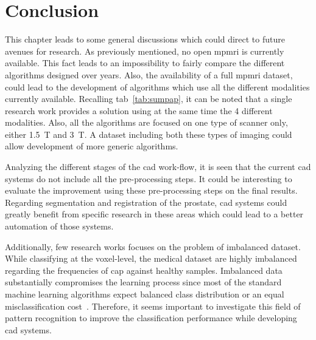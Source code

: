 \section{Conclusion}\label{subsec:chp3:dis:gen-dis}

This chapter leads to some general discussions which could direct to future
avenues for research.
As previously mentioned, no open \ac{mpmri} is currently available.
This fact leads to an impossibility to fairly compare the different algorithms
designed over years.
Also, the availability of a full \ac{mpmri} dataset, could lead to the
development of algorithms which use all the different modalities currently
available.
Recalling \acs{tab}~\ref{tab:sumpap}, it can be noted that a single research
work provides a solution using at the same time the 4 different modalities.
Also, all the algorithms are focused on one type of scanner only, either
\SI{1.5}{\tesla} and \SI{3}{\tesla}.
A dataset including both these types of imaging could allow development of more
generic algorithms.

Analyzing the different stages of the \ac{cad} work-flow, it is seen that the
current \ac{cad} systems do not include all the pre-processing steps.
It could be interesting to evaluate the improvement using these pre-processing
steps on the final results.
Regarding segmentation and registration of the prostate, \ac{cad} systems could
greatly benefit from specific research in these areas which could lead to a
better automation of those systems.

Additionally, few research works focuses on the problem of imbalanced dataset.
While classifying at the voxel-level, the medical dataset are highly imbalanced
regarding the frequencies of \ac{cap} against healthy samples.
Imbalanced data substantially compromises the learning process since most of
the standard machine learning algorithms expect balanced class distribution or
an equal misclassification cost~\cite{he2009learning}.
Therefore, it seems important to investigate this field of pattern recognition
to improve the classification performance while developing \ac{cad} systems.
